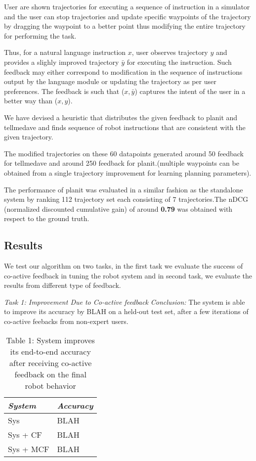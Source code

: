 	User are shown trajectories for executing a sequence of instruction in a simulator and the user can stop trajectories and update specific waypoints of the trajectory by dragging the waypoint to a better point thus modifying the entire trajectory for performing the task.

	Thus, for a natural language instruction $x$, user observes trajectory $y$ and provides a slighly improved trajectory $\bar{y}$ for executing the instruction. Such feedback may either correspond to modification in the sequence of instructions output by the language module or updating the trajectory as per user preferences. The feedback is such that ($x,\bar{y}$) captures the intent of the user in a better way than ($x,y$).

	We have devised a heuristic that distributes the given feedback to planit and tellmedave and finds sequence of robot instructions that are consistent with the given trajectory.

	The modified trajectories on these 60 datapoints generated around 50 feedback for tellmedave and around 250 feedback for planit.(multiple waypoints can be obtained from a single trajectory improvement for learning planning parameters).

	The performance of planit was evaluated in a similar fashion as the standalone system by ranking 112 trajectory set each consisting of 7 trajectories.The nDCG (normalized discounted cumulative gain) of around \textbf{0.79} was obtained with respect to the ground truth.




\subsection{Results} 
We test our algorithm on two tasks, in the first task we evaluate the success of co-active feedback in tuning the robot system and in second task, we evaluate the results from different type of feedback.

\noindent\textit{Task 1: Improvement Due to Co-active feedback}
\textit{Conclusion:} The system is able to improve its accuracy by BLAH on a held-out test set, after a few iterations of co-active feebacks from non-expert users.

\begin{table}
\label{tbl:tsk1}
\caption{Table 1: System improves its end-to-end accuracy after receiving co-active feedback on the final robot behavior}
\centering
\begin{tabular}{|l|l|}
\hline
\textit{System} & \textit{Accuracy} \\
\hline
Sys & BLAH \\
Sys + CF & BLAH \\
Sys + MCF & BLAH \\
\hline
\end{tabular}
\end{table}

